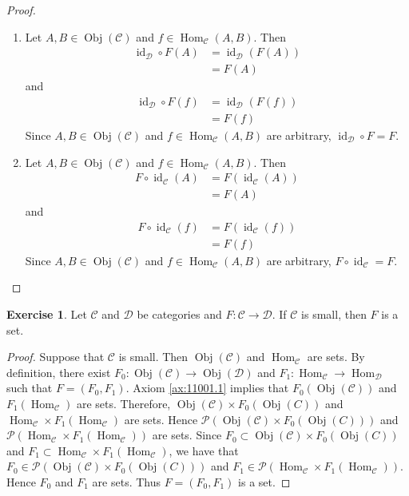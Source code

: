 \documentclass{book}
\theoremstyle{definition}
\newtheorem{ex}[definition]{Exercise}
\newcommand{\MC}{\mathcal{C}}
\newcommand{\MD}{\mathcal{D}}
\newcommand{\MP}{\mathcal{P}}
\newcommand{\lex}[1]{\label{ex:#1}}
\newcommand{\rax}[1]{Axiom \ref{ax:#1}}
\DeclareMathOperator{\id}{id}
\DeclareMathOperator{\Obj}{Obj}
\DeclareMathOperator{\Hom}{Hom}
\DeclareMathOperator*{\0}{\mbf{0}}
\DeclareMathOperator*{\1}{\mbf{1}}
\begin{document}
	\begin{proof}\
		\begin{enumerate}
			\item Let $A, B \in \Obj(\MC)$ and $f \in \Hom_{\MC}(A, B)$. Then 
			\begin{align*}
				\id_{\MD} \circ F(A) 
				& = \id_{\MD}(F(A)) \\
				& = F(A)
			\end{align*}
			and 
			\begin{align*}
				\id_{\MD} \circ F(f) 
				& = \id_{\MD}(F(f)) \\
				& = F(f)
			\end{align*} 
			Since $A, B \in \Obj(\MC)$ and $f \in \Hom_{\MC}(A, B)$ are arbitrary, $\id_{\MD} \circ F = F$.
			\item Let $A, B \in \Obj(\MC)$ and $f \in \Hom_{\MC}(A, B)$. Then
			\begin{align*}
				F \circ \id_{\MC}(A) 
				& = F(\id_{\MC}(A)) \\
				& = F(A) 
			\end{align*}
			and 
			\begin{align*}
				F \circ \id_{\MC}(f) 
				& = F (\id_{\MC}(f)) \\
				& = F(f)
			\end{align*} 
			Since $A, B \in \Obj(\MC)$ and $f \in \Hom_{\MC}(A, B)$ are arbitrary, $ F \circ \id_{\MC} = F$.
		\end{enumerate}
	\end{proof}
	
	\begin{ex} \lex{13008.1}
		Let $\MC$ and $\MD$ be categories and $F:\MC \rightarrow \MD$. If $\MC$ is small, then $F$ is a set.
	\end{ex}
	
	\begin{proof}
		Suppose that $\MC$ is small. Then $\Obj(\MC)$ and $\Hom_{\MC}$ are sets. By definition, there exist $F_0: \Obj(\MC) \rightarrow \Obj(\MD)$ and $F_1: \Hom_{\MC} \rightarrow \Hom_{\MD}$ such that $F = (F_0, F_1)$. \rax{11001.1} implies that $F_0(\Obj(\MC))$ and $F_1(\Hom_{\MC})$ are sets. Therefore, $\Obj(\MC) \times F_0(\Obj(C))$ and $\Hom_{\MC} \times F_1(\Hom_{\MC})$ are sets. Hence $\MP(\Obj(\MC) \times F_0(\Obj(C)))$ and $\MP(\Hom_{\MC} \times F_1(\Hom_{\MC}))$ are sets. Since $F_0 \subset \Obj(\MC) \times F_0(\Obj(C))$ and $F_1 \subset \Hom_{\MC} \times F_1(\Hom_{\MC})$, we have that $F_0 \in \MP(\Obj(\MC) \times F_0(\Obj(C)))$ and $F_1 \in \MP(\Hom_{\MC} \times F_1(\Hom_{\MC}))$. Hence $F_0$ and $F_1$ are sets. Thus $F = (F_0, F_1)$ is a set. 
	\end{proof}
\end{document}

